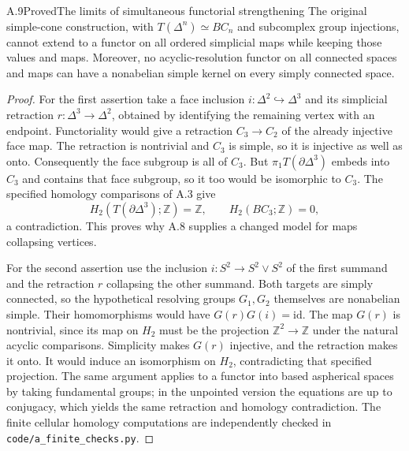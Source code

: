 \begin{claim}{A.9}{Proved}{The limits of simultaneous functorial strengthening}
The original simple-cone construction, with
$T(\Delta^n)\simeq BC_n$ and subcomplex group injections, cannot extend
to a functor on all ordered simplicial maps while keeping those
values and maps. Moreover, no acyclic-resolution functor on all
connected spaces and maps can have a nonabelian simple kernel on
every simply connected space.
\end{claim}
\begin{proof}
For the first assertion take a face inclusion
$i:\Delta^2\hookrightarrow\Delta^3$ and its simplicial retraction
$r:\Delta^3\to\Delta^2$, obtained by identifying the remaining
vertex with an endpoint. Functoriality would give a retraction
$C_3\to C_2$ of the already injective face map. The retraction is
nontrivial and $C_3$ is simple, so it is injective as well as onto.
Consequently the face subgroup is all of $C_3$. But
$\pi_1T(\partial\Delta^3)$ embeds into $C_3$ and contains that face
subgroup, so it too would be isomorphic to $C_3$. The specified
homology comparisons of A.3 give
\[
 H_2(T(\partial\Delta^3);\mathbb Z)=\mathbb Z,
 \qquad H_2(BC_3;\mathbb Z)=0,
\]
a contradiction. This proves why A.8 supplies a changed model for
maps collapsing vertices.

For the second assertion use the inclusion
$i:S^2\to S^2\vee S^2$ of the first summand and the retraction $r$
collapsing the other summand. Both targets are simply connected,
so the hypothetical resolving groups $G_1,G_2$ themselves are
nonabelian simple. Their homomorphisms would have
$G(r)G(i)=\mathrm{id}$. The map $G(r)$ is nontrivial, since its
map on $H_2$ must be the projection
$\mathbb Z^2\to\mathbb Z$ under the natural acyclic comparisons.
Simplicity makes $G(r)$ injective, and the retraction makes it onto.
It would induce an isomorphism on $H_2$, contradicting that specified
projection. The same argument applies to a functor into based
aspherical spaces by taking fundamental groups; in the unpointed
version the equations are up to conjugacy, which yields the same
retraction and homology contradiction. The finite cellular
homology computations are independently checked in
\texttt{code/a\_finite\_checks.py}.
\end{proof}

